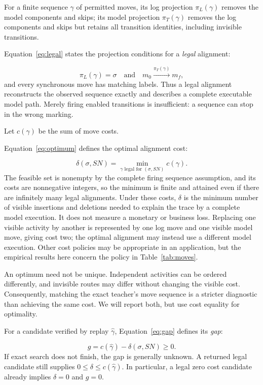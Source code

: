 For a finite sequence $\gamma$ of permitted moves, its log projection $\pi_L(\gamma)$ removes the model components and skips; its model projection $\pi_T(\gamma)$ removes the log components and skips but retains all transition identities, including invisible transitions. \begin{revised}Equation~\eqref{eq:legal} states the projection conditions for a \emph{legal} alignment:\end{revised}
\begin{equation}
 \pi_L(\gamma)=\sigma
 \quad\text{and}\quad
 m_0\xrightarrow{\pi_T(\gamma)}m_f,
 \label{eq:legal}
\end{equation}
and every synchronous move has matching labels. Thus a legal alignment reconstructs the observed sequence exactly and describes a complete executable model path. Merely firing enabled transitions is insufficient: a sequence can stop in the wrong marking.

Let $c(\gamma)$ be the sum of move costs. \begin{revised}Equation~\eqref{eq:optimum} defines the optimal alignment cost:\end{revised}
\begin{equation}
 \delta(\sigma,SN)=\min_{\gamma\text{ legal for }(\sigma,SN)}c(\gamma).
 \label{eq:optimum}
\end{equation}
The feasible set is nonempty by the complete firing sequence assumption, and its costs are nonnegative integers, so the minimum is finite and attained even if there are infinitely many legal alignments. Under these costs, $\delta$ is the minimum number of visible insertions and deletions needed to explain the trace by a complete model execution. It does not measure a monetary or business loss. Replacing one visible activity by another is represented by one log move and one visible model move, giving cost two; the optimal alignment may instead use a different model execution. Other cost policies may be appropriate in an application, but the empirical results here concern the policy in Table~\ref{tab:moves}.

An optimum need not be unique. Independent activities can be ordered differently, and invisible routes may differ without changing the visible cost. Consequently, matching the exact teacher's move sequence is a stricter diagnostic than achieving the same cost. We will report both, but use cost equality for optimality. \begin{revised}For a candidate verified by replay $\widehat\gamma$, Equation~\eqref{eq:gap} defines its \emph{gap}:\end{revised}
\begin{equation}
 g=c(\widehat\gamma)-\delta(\sigma,SN)\geq0.
 \label{eq:gap}
\end{equation}
If exact search does not finish, the gap is generally unknown. A returned legal candidate still supplies $0\leq\delta\leq c(\widehat\gamma)$. In particular, a legal zero cost candidate already implies $\delta=0$ and $g=0$.

